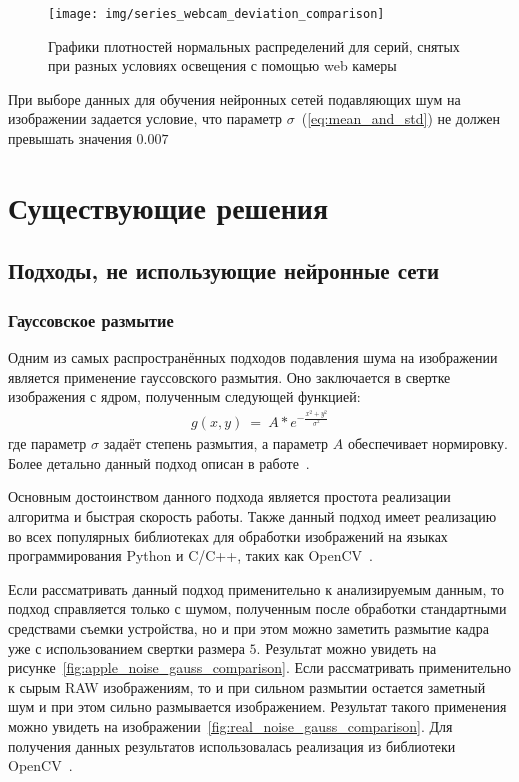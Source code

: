 \begin{figure}[H]
	\centering
	\texttt{[image: img/series\_webcam\_deviation\_comparison]}
	\caption{Графики плотностей нормальных распределений для серий, снятых при разных условиях освещения с помощью web камеры~\autocite{WebCam}}
	\label{fig:distribuion_webcam}
\end{figure}


При выборе данных для обучения нейронных сетей подавляющих шум на изображении задается условие, что параметр $\sigma$~(\ref{eq:mean_and_std}) не должен превышать значения $0.007$

\section{Существующие решения}
\subsection{Подходы, не использующие нейронные сети}

\subsubsection{Гауссовское размытие}
Одним из самых распространённых подходов подавления шума на изображении является применение гауссовского размытия. Оно заключается в свертке изображения с ядром, полученным следующей функцией:
\begin{eqnarray}\label{eq:gauss_kernel_function}
g(x, y)\ =\ A \ast e^{-\frac{x^2 + y^2}{\sigma^2}}
\end{eqnarray}
где параметр $\sigma$ задаёт степень размытия, а параметр $A$ обеспечивает нормировку. Более детально данный подход описан в работе~\autocite{GaussianBilinear}.

Основным достоинством данного подхода является простота реализации алгоритма и быстрая скорость работы. Также данный подход имеет реализацию во всех популярных библиотеках для обработки изображений на языках программирования Python и C/C++, таких как OpenCV~\autocite{OpenCVLib}.

Если рассматривать данный подход применительно к анализируемым данным, то подход справляется только с шумом, полученным после обработки стандартными средствами съемки устройства, но и при этом можно заметить размытие кадра уже с использованием свертки размера $5$. Результат можно увидеть на рисунке~\ref{fig:apple_noise_gauss_comparison}. Если рассматривать применительно к сырым RAW изображениям, то и при сильном размытии остается заметный шум и при этом сильно размывается изображением. Результат такого применения можно увидеть на изображении~\ref{fig:real_noise_gauss_comparison}. Для получения данных результатов использовалась реализация из библиотеки OpenCV~\autocite{OpenCVLib}.


